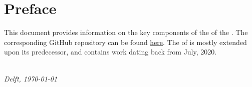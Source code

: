 \chapter*{Preface}

\noindent This document provides information on the key components of the \MakeLowercase{\Topic} of the \Product{} \Version{}. The corresponding GitHub repository can be found \href{https://github.com/BedBasedEcho/robot-firmware}{here}. The \MakeLowercase{\Topic} of \Version{} is mostly extended upon its predecessor, and contains work dating back from July, 2020.  

\begin{flushright}
{\makeatletter\itshape
    \ifdefvoid{\@author@short}{\@author}{\@author@short} \\
    Delft, \today{}
\makeatother}
\end{flushright}
